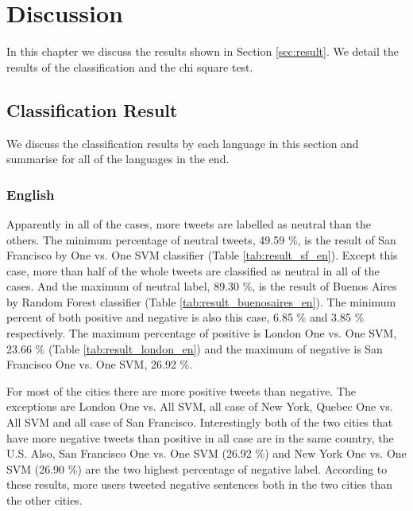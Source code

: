 \chapter{Discussion}
In this chapter we discuss the results shown in Section \ref{sec:result}.
We detail the results of the classification and the chi square test.

\section{Classification Result}\label{sec:clf_result}
We discuss the classification results by each language in this section and summarise for all of the languages in the end.
\subsection{English}
Apparently in all of the cases, more tweets are labelled as neutral than the others.
The minimum percentage of neutral tweets, 49.59 \%, is the result of San Francisco by One vs. One SVM classifier (Table \ref{tab:result_sf_en}).
Except this case, more than half of the whole tweets are classified as neutral in all of the cases.
And the maximum of neutral label, 89.30 \%, is the result of Buenos Aires by Random Forest classifier (Table \ref{tab:result_buenosaires_en}).
The minimum percent of both positive and negative is also this case, 6.85 \% and 3.85 \% respectively.
The maximum percentage of positive is London One vs. One SVM, 23.66 \% (Table \ref{tab:result_london_en}) and the maximum of negative is San Francisco One vs. One SVM, 26.92 \%.


For most of the cities there are more positive tweets than negative.
The exceptions are London One vs. All SVM, all case of New York, Quebec One vs. All SVM and all case of San Francisco.
Interestingly both of the two cities that have more negative tweets than positive in all case are in the same country, the U.S.
Also, San Francisco One vs. One SVM (26.92 \%) and New York One vs. One SVM (26.90 \%) are the two highest percentage of negative label.
According to these results, more users tweeted negative sentences both in the two cities than the other cities.
